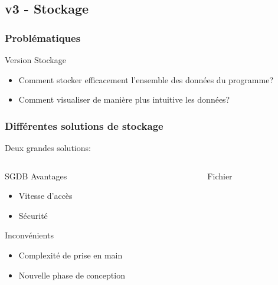 \documentclass{beamer}
\begin{document}
        \subsection{v3 - Stockage}
            \begin{frame}
                \frametitle{Problématiques}
                Version Stockage 
                \pause
                \begin{itemize}
                    \item Comment stocker efficacement l'ensemble des données du programme?
                    \pause
                    \item Comment visualiser de manière plus intuitive les données?
                \end{itemize}
            \end{frame}
            \begin{frame}
                \frametitle{Différentes solutions de stockage}
                Deux grandes solutions:
                \pause
                \begin{columns}[t]
                    \begin{column}{4cm}
                        \begin{block}{SGDB}
                            \pause
                            Avantages
                            \begin{itemize}
                                \pause
                                \item Vitesse d'accès
                                \pause
                                \item Sécurité
                            \end{itemize}
                            \pause
                            Inconvénients 
                            \begin{itemize}
                                \pause
                                \item Complexité de prise en main
                                \pause
                                \item Nouvelle phase de conception
                            \end{itemize}
                        \end{block}
                    \end{column}
                    \pause
                    \begin{column}{4cm}
                        \begin{block}{Fichier}

\end{block}
\end{column}
\end{columns}
\end{frame}
\end{document}
